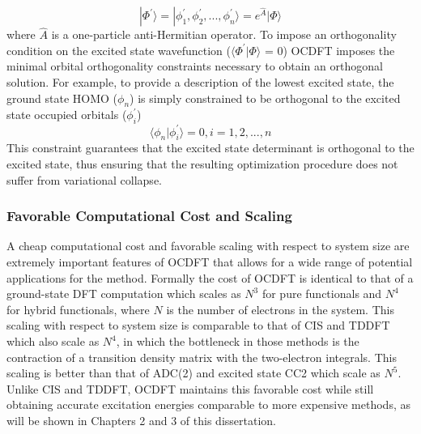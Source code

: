 \documentclass[final]{emory}
\begin{document}
\begin{equation}
|\Phi^{\prime} \rangle = |\phi_1^{\prime}, \phi_2^{\prime}, ..., \phi_n^{\prime} \rangle = e^{\hat{A}}|\Phi\rangle
\end{equation}
where $\hat{A}$ is a one-particle anti-Hermitian operator. To impose an orthogonality condition on the excited state wavefunction ($\langle \Phi^{\prime}|\Phi\rangle$ = 0) OCDFT imposes the minimal orbital orthogonality constraints necessary to obtain an orthogonal solution. For example, to provide a description of the lowest excited state, the ground state HOMO ($\phi_n$) is simply constrained to be orthogonal to the excited state occupied orbitals ($\phi_i^{\prime}$) 
\begin{equation}
\langle \phi_n|\phi_i^{\prime} \rangle = 0, i = 1,2,...,n
\end{equation}
This constraint guarantees that the excited state determinant is orthogonal to the excited state, thus ensuring that the resulting optimization procedure does not suffer from variational collapse. 
\subsubsection{Favorable Computational Cost and Scaling}
A cheap computational cost and favorable scaling with respect to system size are extremely important features of OCDFT that allows for a wide range of potential applications for the method. Formally the cost of OCDFT is identical to that of a ground-state DFT computation which scales as $N^3$ for pure functionals and $N^4$ for hybrid functionals, where $N$ is the number of electrons in the system. This scaling with respect to system size is comparable to that of CIS and TDDFT which also scale as $N^4$, in which the bottleneck in those methods is the contraction of a transition density matrix with the two-electron integrals. This scaling is better than that of ADC(2) and excited state CC2 which scale as $N^5$. Unlike CIS and TDDFT, OCDFT maintains this favorable cost while still obtaining accurate excitation energies comparable to more expensive methods, as will be shown in Chapters 2 and 3 of this dissertation.
\end{document}

